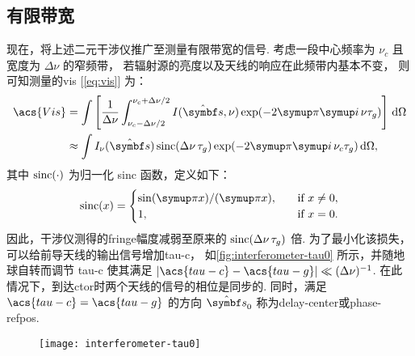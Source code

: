 \subsection{有限带宽}

现在，将上述二元干涉仪推广至测量有限带宽的信号.
考虑一段中心频率为 $\nu_c$ 且宽度为 $\Delta\nu$ 的窄频带，
若辐射源的亮度以及天线的响应在此频带内基本不变，
则可知测量的\acl{vis} [\autoref{eq:vis}] 为：
\begin{align}
  \acs{Vis} &= \int \left[ \frac{1}{\Delta\nu}
        \int_{\nu_c-\Delta\nu/2}^{\nu_c+\Delta\nu/2}
        I(\hat{\B{s}}, \nu) \exp (-2\Cpi\Ci\, \nu\tau_g)
      \right] \D{\Omega} \\
    &\approx \int I_{\nu}(\hat{\B{s}}) \sinc (\Delta\nu\,\tau_g)
      \exp (-2\Cpi\Ci\, \nu_c\tau_g) \D{\Omega},
  \label{eq:vis-bw}
\end{align}
其中 $\operatorname{sinc}(\cdot)$ 为归一化 sinc 函数，定义如下：
\begin{equation}
  \label{eq:sinc}
  \sinc(x) =
    \begin{cases}
      \sin(\Cpi x) / (\Cpi x), & \quad \text{if } x \neq 0, \\
      1, & \quad \text{if } x = 0.
    \end{cases}
\end{equation}
因此，干涉仪测得的\acl{fringe}幅度减弱至原来的 $\operatorname{sinc}(\Delta\nu\,\tau_g)$ 倍.
为了最小化该损失，可以给前导天线的输出信号增加\ac{tau-c}，
如\autoref{fig:interferometer-tau0} 所示，并随地球自转而调节 \acs{tau-c}
使其满足 $|\acs{tau-c} - \acs{tau-g}| \ll (\Delta\nu)^{-1}$.
在此情况下，到达\acl{ctor}时两个天线的信号的相位是同步的.
同时，满足 $\acs{tau-c} = \acs{tau-g}$ 的方向 $\hat{\B{s}}_0$
称为\ac{delay-center}或\ac{phase-refpos}.

\begin{figure}
  \centering
  \texttt{[image: interferometer-tau0]}
  \label{fig:interferometer-tau0}
\end{figure}

